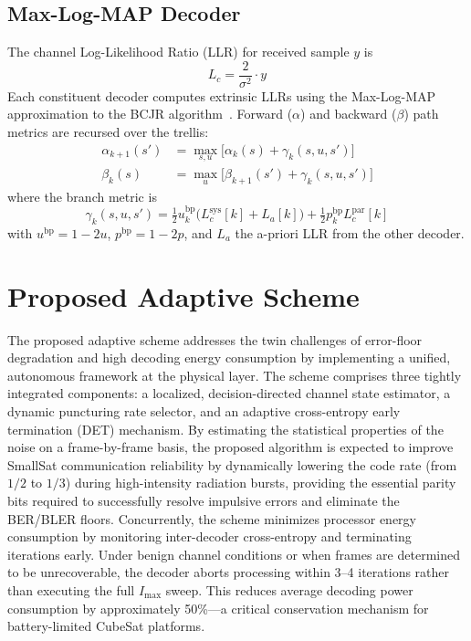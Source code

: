 \documentclass[journal,twocolumn]{IEEEtran}
\begin{document}
\subsection{Max-Log-MAP Decoder}
The channel Log-Likelihood Ratio (LLR) for received sample $y$ is
\begin{equation}
  L_c = \frac{2}{\sigma^2} \cdot y
\end{equation}
Each constituent decoder computes extrinsic LLRs using the Max-Log-MAP
approximation to the BCJR algorithm~\cite{bahl1974bcjr}.  Forward ($\alpha$)
and backward ($\beta$) path metrics are recursed over the trellis:
\begin{align}
  \alpha_{k+1}(s') &= \max_{s,u}\bigl[\alpha_k(s) + \gamma_k(s,u,s')\bigr] \\
  \beta_k(s) &= \max_{u}\bigl[\beta_{k+1}(s') + \gamma_k(s,u,s')\bigr]
\end{align}
where the branch metric is
\begin{equation}
  \gamma_k(s,u,s') = \tfrac{1}{2}u_k^{\mathrm{bp}}\bigl(L_c^{\mathrm{sys}}[k]
    + L_a[k]\bigr) + \tfrac{1}{2}p_k^{\mathrm{bp}} L_c^{\mathrm{par}}[k]
\end{equation}
with $u^{\mathrm{bp}} = 1-2u$, $p^{\mathrm{bp}} = 1-2p$, and $L_a$
the a-priori LLR from the other decoder.

\section{Proposed Adaptive Scheme}
\label{sec:proposed}

The proposed adaptive scheme addresses the twin challenges of error-floor degradation and high decoding energy consumption by implementing a unified, autonomous framework at the physical layer. The scheme comprises three tightly integrated components: a localized, decision-directed channel state estimator, a dynamic puncturing rate selector, and an adaptive cross-entropy early termination (DET) mechanism. By estimating the statistical properties of the noise on a frame-by-frame basis, the proposed algorithm is expected to improve SmallSat communication reliability by dynamically lowering the code rate (from $1/2$ to $1/3$) during high-intensity radiation bursts, providing the essential parity bits required to successfully resolve impulsive errors and eliminate the BER/BLER floors. Concurrently, the scheme minimizes processor energy consumption by monitoring inter-decoder cross-entropy and terminating iterations early. Under benign channel conditions or when frames are determined to be unrecoverable, the decoder aborts processing within 3--4 iterations rather than executing the full $I_{\max}$ sweep. This reduces average decoding power consumption by approximately 50\%—a critical conservation mechanism for battery-limited CubeSat platforms.
\end{document}

